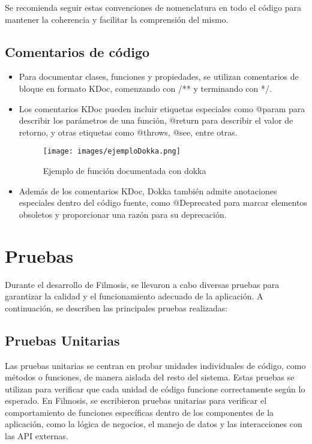 \documentclass{article}
\begin{document}
    Se recomienda seguir estas convenciones de nomenclatura en todo el código para mantener la coherencia y facilitar la comprensión del mismo.

\subsection{Comentarios de código}

\begin{itemize}
    \item Para documentar clases, funciones y propiedades, se utilizan comentarios de bloque en formato KDoc, comenzando con /** y terminando con */.
    \item Los comentarios KDoc pueden incluir etiquetas especiales como @param para describir los parámetros de una función, @return para describir el valor de retorno, y otras etiquetas como @throws, @see, entre otras.

    \begin{figure}[h]
            \centering
            \texttt{[image: images/ejemploDokka.png]}
            \caption{Ejemplo de función documentada con dokka}
            \label{fig:instalacion_apk}
    \end{figure}

    \item Además de los comentarios KDoc, Dokka también admite anotaciones especiales dentro del código fuente, como @Deprecated para marcar elementos obsoletos y proporcionar una razón para su deprecación.

\end{itemize}

\section{Pruebas}

Durante el desarrollo de Filmosis, se llevaron a cabo diversas pruebas para garantizar la calidad y el funcionamiento adecuado de la aplicación. A continuación, se describen las principales pruebas realizadas:

\subsection{Pruebas Unitarias}

Las pruebas unitarias se centran en probar unidades individuales de código, como métodos o funciones, de manera aislada del resto del sistema. Estas pruebas se utilizan para verificar que cada unidad de código funcione correctamente según lo esperado. En Filmosis, se escribieron pruebas unitarias para verificar el comportamiento de funciones específicas dentro de los componentes de la aplicación, como la lógica de negocios, el manejo de datos y las interacciones con las API externas.
\end{document}
